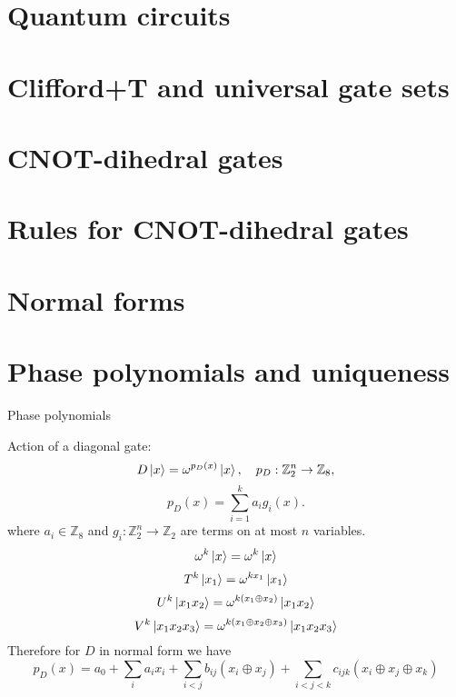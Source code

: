 \documentclass{beamer}
\theoremstyle{definition}
\newcommand{\changefont}[3]{\fontfamily{#1} \fontseries{#2} \fontshape{#3} \selectfont}
\begin{document}

\changefont{cmss}{m}{n}
\title{}
\author{}
\date{}
\frame{\titlepage}



\section{Quantum circuits}
\section{Clifford+T and universal gate sets}
\section{CNOT-dihedral gates}
\section{Rules for CNOT-dihedral gates}
\section{Normal forms}
\section{Phase polynomials and uniqueness}

\begin{frame}{Phase polynomials}

Action of a diagonal gate:
$$ D \ket{x} = \omega^{p_D(x)}\ket{x}, \quad p_D: \mathbb{Z}_2^n \rightarrow \mathbb{Z}_8 ,$$
$$ p_D(x) = \sum_{i=1}^k a_i g_i(x) .$$
where $a_i \in \mathbb{Z}_8$ and $g_i:\mathbb{Z}_2^n \rightarrow \mathbb{Z}_2$ are terms on at most $n$ variables.
$$ \omega^k \ket{x} = \omega^k \ket{x} $$
$$ T^k \ket{x_1} = \omega^{kx_1}\ket{x_1}$$
$$ U^k \ket{x_1x_2} = \omega^{k(x_1\oplus x_2)}\ket{x_1x_2}$$
$$ V^k \ket{x_1x_2x_3} = \omega^{k(x_1\oplus x_2 \oplus x_3)}\ket{x_1x_2x_3}$$
Therefore for $D$ in normal form we have
$$ p_D(x) = a_0 + \sum_i a_i x_i + \sum_{i<j}b_{ij} (x_i \oplus x_j) + \sum_{i<j<k}c_{ijk} (x_i \oplus x_j \oplus x_k)$$

\end{frame}
\end{document}
